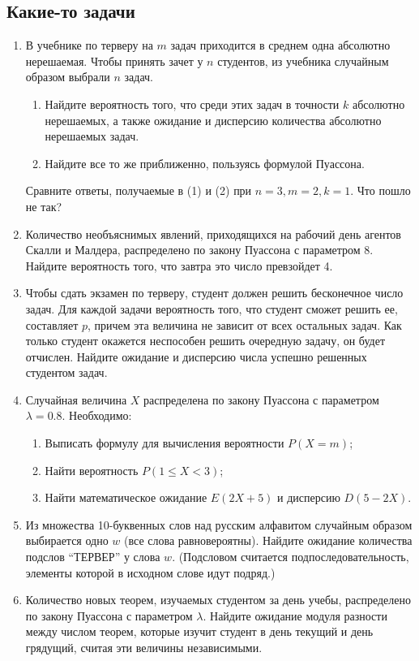 \documentclass[a4paper, 14pt]{extarticle}
\begin{document}
\subsection{Какие-то задачи}
\begin{enumerate}
\item В учебнике по терверу на $m$ задач приходится в среднем одна абсолютно нерешаемая. Чтобы принять зачет у $n$ студентов, из учебника случайным образом выбрали $n$ задач.
\begin{enumerate}
  \item Найдите вероятность того, что среди этих задач в точности $k$ абсолютно нерешаемых, а также ожидание и дисперсию количества абсолютно нерешаемых задач.
  \item Найдите все то же приближенно, пользуясь формулой Пуассона.
\end{enumerate}
Сравните ответы, получаемые в (1) и (2) при $n=3, m=2, k=1$. Что пошло не так?

\item Количество необъяснимых явлений, приходящихся на рабочий день агентов Скалли и Малдера, распределено по закону Пуассона с параметром 8. Найдите вероятность того, что завтра это число превзойдет 4.

\item Чтобы сдать экзамен по терверу, студент должен решить бесконечное число задач. Для каждой задачи вероятность того, что студент сможет решить ее, составляет $p$, причем эта величина не зависит от всех остальных задач. Как только студент окажется неспособен решить очередную задачу, он будет отчислен. Найдите ожидание и дисперсию числа успешно решенных студентом задач.

\item Случайная величина $X$ распределена по закону Пуассона с параметром $\lambda=0.8$. Необходимо:
\begin{enumerate}
\item Выписать формулу для вычисления вероятности $P(X=m)$;
\item Найти вероятность $P(1≤X<3)$;
\item Найти математическое ожидание $E(2X+5)$ и дисперсию $D(5−2X)$.
\end{enumerate}

\item Из множества 10-буквенных слов над русским алфавитом случайным образом выбирается одно $w$ (все слова равновероятны). Найдите ожидание количества подслов “ТЕРВЕР” у слова $w$. (Подсловом считается подпоследовательность, элементы которой в исходном слове идут подряд.)

\item Количество новых теорем, изучаемых студентом за день учебы, распределено по закону Пуассона с параметром $\lambda$. Найдите ожидание модуля разности между числом теорем, которые изучит студент в день текущий и день грядущий, считая эти величины независимыми.

\end{enumerate}
\end{document}
